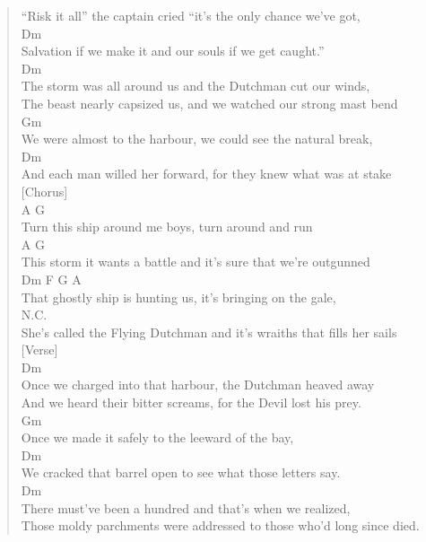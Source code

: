 \documentclass[11pt]{article}
\begin{document}
\begin{verse}
``Risk it all'' the captain cried ``it's the only chance we've got,\\
Dm\\
Salvation if we make it and our souls if we get caught.''\\
\vspace*{1em}
Dm\\
The storm was all around us and the Dutchman cut our winds,\\
The beast nearly capsized us, and we watched our strong mast bend\\
Gm\\
We were almost to the harbour, we could see the natural break,\\
Dm\\
And each man willed her forward, for they knew what was at stake\\
\vspace*{1em}
[Chorus]\\
A                              G\\
Turn this ship around me boys, turn around and run\\
A                                     G\\
This storm it wants a battle and it's sure that we're outgunned\\
Dm                    F                G               A\\
That ghostly ship is hunting us, it's bringing on the gale,\\
N.C.\\
She's called the Flying Dutchman and it's wraiths that fills her sails\\
\vspace*{1em}
[Verse]\\
Dm\\
Once we charged into that harbour, the Dutchman heaved away\\
And we heard their bitter screams, for the Devil lost his prey.\\
Gm\\
Once we made it safely to the leeward of the bay,\\
Dm\\
We cracked that barrel open to see what those letters say.\\
\vspace*{1em}
Dm\\
There must've been a hundred and that's when we realized,\\
Those moldy parchments were addressed to those who'd long since died.\\

\end{verse}
\end{document}
